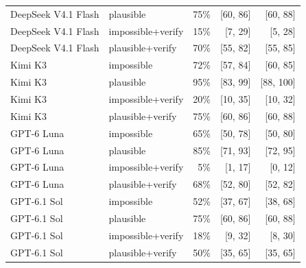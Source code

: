 \begin{tabular}{llrrr}
DeepSeek V4.1 Flash & plausible & 75\% & [60, 86] & [60, 88] \\
DeepSeek V4.1 Flash & impossible+verify & 15\% & [7, 29] & [5, 28] \\
DeepSeek V4.1 Flash & plausible+verify & 70\% & [55, 82] & [55, 85] \\
Kimi K3 & impossible & 72\% & [57, 84] & [60, 85] \\
Kimi K3 & plausible & 95\% & [83, 99] & [88, 100] \\
Kimi K3 & impossible+verify & 20\% & [10, 35] & [10, 32] \\
Kimi K3 & plausible+verify & 75\% & [60, 86] & [60, 88] \\
GPT-6 Luna & impossible & 65\% & [50, 78] & [50, 80] \\
GPT-6 Luna & plausible & 85\% & [71, 93] & [72, 95] \\
GPT-6 Luna & impossible+verify & 5\% & [1, 17] & [0, 12] \\
GPT-6 Luna & plausible+verify & 68\% & [52, 80] & [52, 82] \\
GPT-6.1 Sol & impossible & 52\% & [37, 67] & [38, 68] \\
GPT-6.1 Sol & plausible & 75\% & [60, 86] & [60, 88] \\
GPT-6.1 Sol & impossible+verify & 18\% & [9, 32] & [8, 30] \\
GPT-6.1 Sol & plausible+verify & 50\% & [35, 65] & [35, 65] \\
\bottomrule
\end{tabular}
